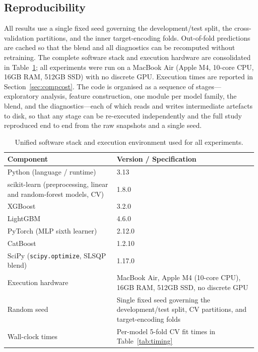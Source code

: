 \documentclass[review,12pt]{elsarticle}
\begin{document}
\subsection{Reproducibility}
All results use a single fixed seed governing the development/test split, the
cross-validation partitions, and the inner target-encoding folds. Out-of-fold
predictions are cached so that the blend and all diagnostics can be recomputed
without retraining. The complete software stack and execution hardware are
consolidated in Table~\ref{tab:stack}; all experiments were run on a MacBook Air
(Apple M4, 10-core CPU, 16GB RAM, 512GB SSD) with no discrete GPU. Execution times
are reported in Section~\ref{sec:compcost}. The code is organised as a
sequence of stages---exploratory analysis, feature construction, one module per
model family, the blend, and the diagnostics---each of which reads and writes
intermediate artefacts to disk, so that any stage can be re-executed independently
and the full study reproduced end to end from the raw snapshots and a single seed.

\begin{table}[!t]
\caption{Unified software stack and execution environment used for all
experiments.}
\label{tab:stack}
\centering
\small
\begin{tabular}{lp{1.7in}}
\toprule
Component & Version / Specification \\
\midrule
Python (language / runtime) & 3.13 \\
scikit-learn (preprocessing, linear and random-forest models, CV) & 1.8.0 \\
XGBoost & 3.2.0 \\
LightGBM & 4.6.0 \\
PyTorch (MLP sixth learner) & 2.12.0 \\
CatBoost & 1.2.10 \\
SciPy (\texttt{scipy.optimize}, SLSQP blend) & 1.17.0 \\
Execution hardware & MacBook Air, Apple M4 (10-core CPU), 16GB RAM, 512GB SSD, no discrete GPU \\
Random seed & Single fixed seed governing the development/test split, CV partitions, and target-encoding folds \\
Wall-clock times & Per-model 5-fold CV fit times in Table~\ref{tab:timing} \\
\bottomrule
\end{tabular}
\end{table}

\end{document}
